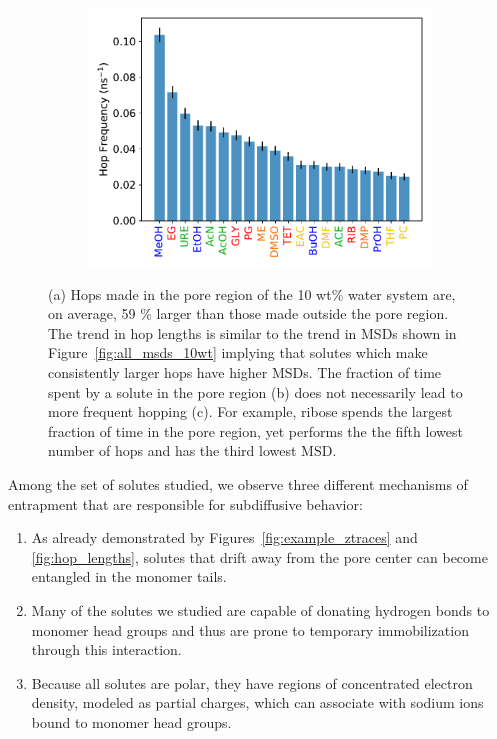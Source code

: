 \documentclass{article}
\begin{document}
\begin{figure}[!htb]
\begin{subfigure}{0.325\textwidth}
  \includegraphics[width=\textwidth]{hopfreq_total.pdf}
  \caption{}\label{fig:hopfreq}
  \end{subfigure}
  \caption{(a) Hops made in the pore region of the 10 wt\% water system
  are, on average, 59 \% larger than those made outside the pore region.
  The trend in hop lengths is similar to the trend in MSDs shown in
  Figure~\ref{fig:all_msds_10wt} implying that solutes which make consistently
  larger hops have higher MSDs. The fraction of time spent by a solute in the
  pore region (b) does not necessarily lead to more frequent hopping (c). For
  example, ribose spends the largest fraction of time in the pore region, yet
  performs the the fifth lowest number of hops and has the third lowest MSD.}\label{fig:hops}
  \end{figure}
  
  Among the set of solutes studied, we observe three different mechanisms 
  of entrapment that are responsible for subdiffusive behavior:
  \begin{enumerate}
    \item As already demonstrated by Figures~\ref{fig:example_ztraces} and 
    \ref{fig:hop_lengths}, solutes that drift away from the pore center
    can become entangled in the monomer tails. 
    \item Many of the solutes we studied are capable of donating hydrogen bonds to
    monomer head groups and thus are prone to temporary immobilization through 
    this interaction.
    \item Because all solutes are polar, they have regions of concentrated electron
    density, modeled as partial charges, which can associate with sodium ions
    bound to monomer head groups.
  \end{enumerate}
  
\end{document}

